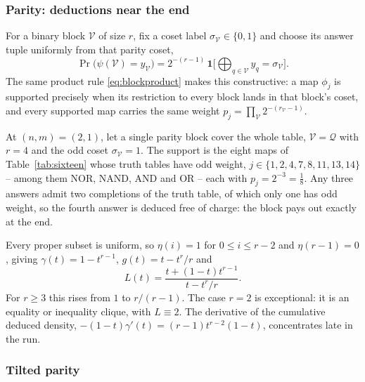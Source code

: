 \subsubsection{Parity: deductions near the end}

For a binary block $\mathcal V$ of size $r$, fix a coset label
$\sigma_{\mathcal V}\in\{0,1\}$ and choose its answer tuple uniformly
from that parity coset,
%
\begin{equation}
  \Pr\big(\psi(\mathcal V) = y_{\mathcal V}\big)
  = 2^{-(r-1)}\,\mathbf 1\Big[\textstyle
  \bigoplus_{q\in\mathcal V}y_q = \sigma_{\mathcal V}\Big].
  \label{eq:parityprior}
\end{equation}
%
The same product rule \eqref{eq:blockproduct} makes this
constructive: a map $\phi_j$ is supported precisely when its
restriction to every block lands in that block's coset, and every
supported map carries the same weight
$p_j = \prod_{\mathcal V} 2^{-(r_{\mathcal V}-1)}$.

\begin{example}
At $(n,m) = (2,1)$, let a single parity block cover the whole table,
$\mathcal V = \mathcal Q$ with $r = 4$ and the odd coset
$\sigma_{\mathcal V} = 1$. The support is the eight maps of
Table~\ref{tab:sixteen} whose truth tables have odd weight,
$j \in \{1, 2, 4, 7, 8, 11, 13, 14\}$ -- among them NOR, NAND, AND
and OR -- each with $p_j = 2^{-3} = \tfrac18$. Any three answers admit two
completions of the truth table, of which only one has odd weight,
so the fourth answer is deduced free of charge: the block pays out
exactly at the end.
\end{example}

Every proper subset is uniform, so $\eta(i) = 1$ for
$0\le i\le r-2$ and $\eta(r-1) = 0$, giving
$\gamma(t) = 1-t^{r-1}$, $g(t) = t - t^r/r$ and
%
\begin{equation}
  L(t) = \frac{t + (1-t)t^{r-1}}{t - t^r/r}. 
  \label{eq:parity}
\end{equation}
%
For $r \ge 3$ this rises from $1$ to $r/(r-1)$. The case $r = 2$ is
exceptional: it is an equality or inequality clique, with
$L \equiv 2$. The derivative of the cumulative deduced density,
$-(1-t)\gamma'(t) = (r-1)t^{r-2}(1-t)$, concentrates late in the run.

\subsubsection{Tilted parity}

